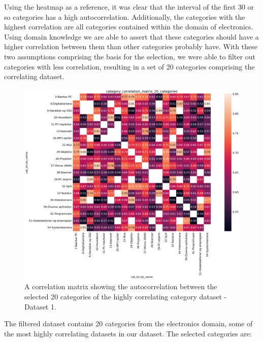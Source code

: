 Using the heatmap as a reference, it was clear that the interval of the first 30 or so categories has a high autocorrelation.
Additionally, the categories with the highest correlation are all categories contained within the domain of electronics.
Using domain knowledge we are able to assert that these categories should have a higher correlation between them than other categories probably have.
With these two assumptions comprising the basis for the selection, we were able to filter out categories with less correlation, resulting in a set of 20 categories comprising the correlating dataset.
\begin{figure}[h!]
  \centering
  \includegraphics[width=\textwidth]{./figs/dataset/category_correlation_matrix_20_categories.png}
  \hfill
  \caption{A correlation matrix showing the autocorrelation between the selected 20 categories of the highly correlating category dataset - Dataset 1.}
  \label{fig:dataset:heatmap_20_correlating}
\end{figure}


The filtered dataset contains 20 categories from the electronics domain, some of the most highly correlating datasets in our dataset.
The selected categories are:

